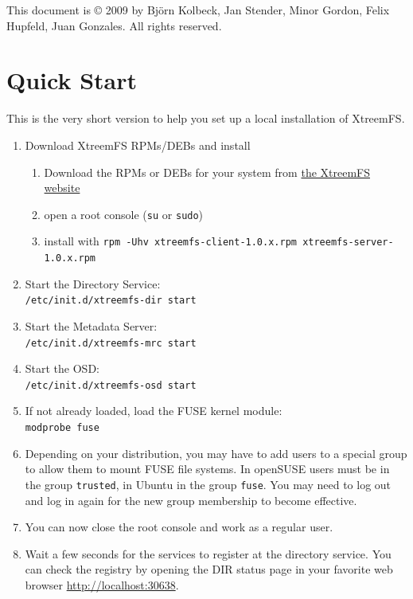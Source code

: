 \documentclass[a4paper,10pt]{book}
\begin{document}
This document is \copyright{} 2009 by Bj\"orn Kolbeck, Jan Stender, Minor Gordon, Felix Hupfeld, Juan Gonzales. All rights reserved.

\setcounter{tocdepth}{10}
\tableofcontents

\chapter{Quick Start}

This is the very short version to help you set up a local installation of XtreemFS.

\begin{enumerate}
 \item Download XtreemFS RPMs/DEBs and install
	\begin{enumerate}
		\item Download the RPMs or DEBs for your system from \href{http://www.XtreemFS.com}{the XtreemFS website}
		\item open a root console (\texttt{su} or \texttt{sudo})
		\item install with \texttt{rpm -Uhv xtreemfs-client-1.0.x.rpm xtreemfs-server-1.0.x.rpm}
	\end{enumerate}
\item Start the Directory Service:\\
	\texttt{/etc/init.d/xtreemfs-dir start}
\item Start the Metadata Server:\\
	\texttt{/etc/init.d/xtreemfs-mrc start}
\item Start the OSD:\\
	\texttt{/etc/init.d/xtreemfs-osd start}

\item If not already loaded, load the FUSE kernel module:\\
	\texttt{modprobe fuse}

\item Depending on your distribution, you may have to add users to a special group to allow them to mount FUSE file systems. In openSUSE users must be in the group \texttt{trusted}, in Ubuntu in the group \texttt{fuse}. You may need to log out and log in again for the new group membership to become effective.

\item You can now close the root console and work as a regular user.

\item Wait a few seconds for the services to register at the directory service. You can check the registry by opening the DIR status page in your favorite web browser \href{http://localhost:30638}{http://localhost:30638}.


\end{enumerate}
\end{document}
